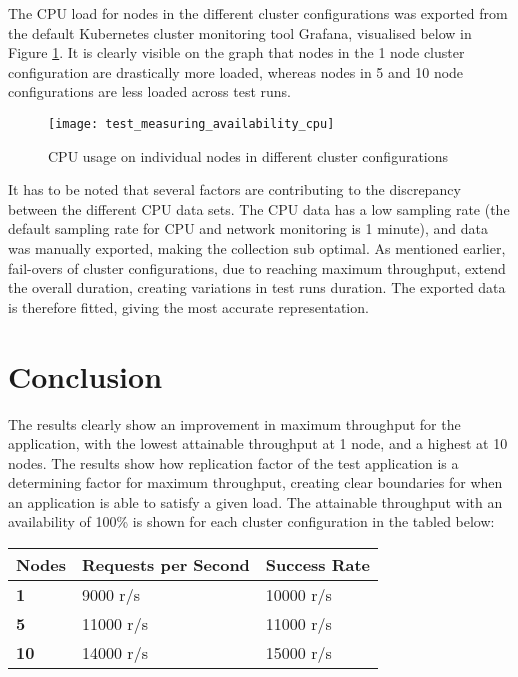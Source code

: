 The CPU load for nodes in the different cluster configurations was exported from the default Kubernetes cluster monitoring tool Grafana, visualised below in Figure \ref{fig:test_measuring_availability_cpu}. It is clearly visible on the graph that nodes in the 1 node cluster configuration are drastically more loaded, whereas nodes in 5 and 10 node configurations are less loaded across test runs.

\begin{figure}[!htb]
  \texttt{[image: test\_measuring\_availability\_cpu]}  
  \caption{CPU usage on individual nodes in different cluster configurations}
  \label{fig:test_measuring_availability_cpu}
\end{figure}

It has to be noted that several factors are contributing to the discrepancy between the different CPU data sets. The CPU data has a low sampling rate (the default sampling rate for CPU and network monitoring is 1 minute), and data was manually exported, making the collection sub optimal. As mentioned earlier, fail-overs of cluster configurations, due to reaching maximum throughput, extend the overall duration, creating variations in test runs duration. The exported data is therefore fitted, giving the most accurate representation.

\section{Conclusion}
The results clearly show an improvement in maximum throughput for the application, with the lowest attainable throughput at 1 node, and a highest at 10 nodes. The results show how replication factor of the test application is a determining factor for maximum throughput, creating clear boundaries for when an application is able to satisfy a given load. The attainable throughput with an availability of 100\% is shown for each cluster configuration in the tabled below:

\begin{center}
\begin{tabular}{ |p{2cm}|p{5cm}|p{5cm}|  }
 \hline
{\textbf{Nodes}} & {\textbf{Requests per Second}} & {\textbf{Success Rate}}\\
 \hline
 \textbf{1} & 9000 r/s & 10000 r/s\\
 \hline
 \textbf{5} & 11000 r/s & 11000 r/s\\ 
 \hline
 \textbf{10} & 14000 r/s & 15000 r/s\\ 
 \hline
\end{tabular}
\end{center}

